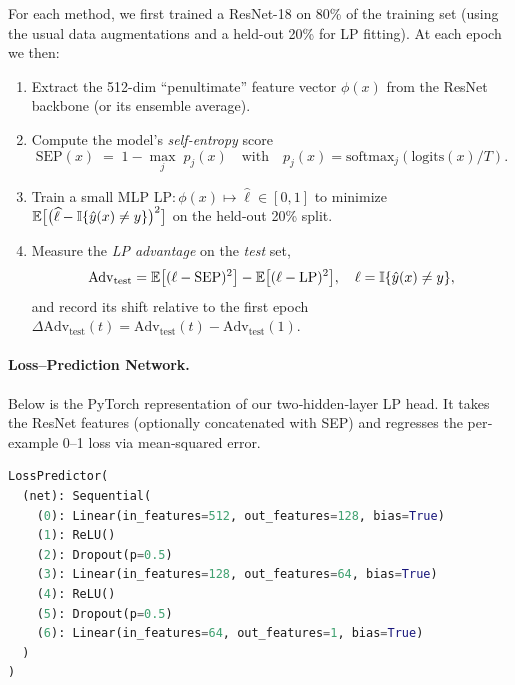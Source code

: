 For each method, we first trained a ResNet-18 on 80\% of the training set (using the usual data augmentations and a held-out 20\% for LP fitting). At each epoch we then:

\begin{enumerate}[leftmargin=1.2em]
  \item Extract the 512-dim “penultimate” feature vector \(\phi(x)\) from the ResNet backbone (or its ensemble average).
  \item Compute the model’s \emph{self-entropy} score
    \[
      \mathrm{SEP}(x) \;=\; 1 - \max_j\;p_j(x)
      \quad\text{with}\quad p_j(x)=\mathrm{softmax}_j(\mathrm{logits}(x)/T).
    \]
  \item Train a small MLP \(\mathrm{LP}\colon \phi(x)\mapsto\widehat\ell\in[0,1]\) to minimize
    \(\mathbb{E}\bigl[\bigl(\widehat\ell - \mathbb{I}\{\hat y(x)\neq y\}\bigr)^2\bigr]\)
    on the held-out 20\% split.
  \item Measure the \emph{LP advantage} on the \emph{test} set,
    \[
      \mathrm{Adv}_{\mathrm{test}}
      = \mathbb{E}\bigl[(\ell-\mathrm{SEP})^2\bigr]
        - \mathbb{E}\bigl[(\ell-\mathrm{LP})^2\bigr],
      \quad \ell=\mathbb{I}\{\hat y(x)\neq y\},
    \]
    and record its shift relative to the first epoch
    \(\Delta\mathrm{Adv}_{\mathrm{test}}(t)=\mathrm{Adv}_{\mathrm{test}}(t)-\mathrm{Adv}_{\mathrm{test}}(1).\)
\end{enumerate}

\paragraph{Loss–Prediction Network.}
Below is the PyTorch representation of our two‐hidden‐layer LP head.  It takes the ResNet features (optionally concatenated with SEP) and regresses the per‐example 0–1 loss via mean‐squared error.

\begin{lstlisting}[language=Python]
LossPredictor(
  (net): Sequential(
    (0): Linear(in_features=512, out_features=128, bias=True)
    (1): ReLU()
    (2): Dropout(p=0.5)
    (3): Linear(in_features=128, out_features=64, bias=True)
    (4): ReLU()
    (5): Dropout(p=0.5)
    (6): Linear(in_features=64, out_features=1, bias=True)
  )
)
\end{lstlisting}

